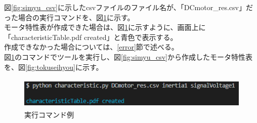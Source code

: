 図\ref{fig:simyu_csv}に示したcsvファイルのファイル名が、「DCmotor\_res.csv」だった場合の実行コマンドを、図\ref{fig:zikkou}に示す。\\
モータ特性表が作成できた場合は、図\ref{fig:zikkou}に示すように、画面上に「characteristicTable.pdf created」と青色で表示する。\\
作成できなかった場合については、\ref{error}節で述べる。\\
図\ref{fig:zikkou}のコマンドでツールを実行し、図\ref{fig:simyu_csv}から作成したモータ特性表を、図\ref{fig:tokuseihyou}に示す。

\begin{figure}[t]
	\centering
	\includegraphics[width=12cm,height=1.5cm]{./Image/succes_comand.png}
	\caption{実行コマンド例}
	\label{fig:zikkou}
\end{figure}



